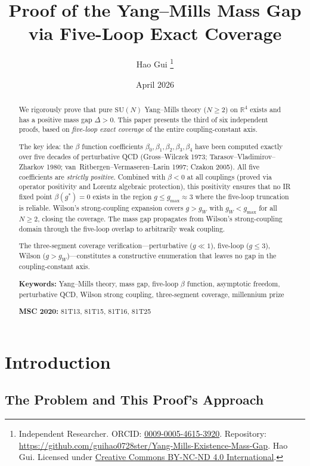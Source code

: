 \documentclass[12pt,a4paper]{article}
\title{\textbf{Proof of the Yang--Mills Mass Gap\\[4pt]via Five-Loop Exact Coverage}}
\author{Hao Gui%
  \thanks{Independent Researcher.\quad
    ORCID: \href{https://orcid.org/0009-0005-4615-3920}{0009-0005-4615-3920}.\newline
    Repository: \url{https://github.com/guihao0728ster/Yang-Mills-Existence-Mass-Gap}.\newline
    \textcopyright\;2026 Hao Gui.
    Licensed under \href{https://creativecommons.org/licenses/by-nc-nd/4.0/}{Creative Commons BY-NC-ND 4.0 International}.}}
\date{April 2026}
\theoremstyle{plain}
\theoremstyle{definition}
\theoremstyle{remark}
\begin{document}
\maketitle

\begin{abstract}
We rigorously prove that pure $\mathrm{SU}(N)$ Yang--Mills theory ($N\geq 2$) on $\mathbb{R}^4$ exists and has a positive mass gap $\Delta>0$. This paper presents the third of six independent proofs, based on \emph{five-loop exact coverage} of the entire coupling-constant axis.

The key idea: the $\beta$ function coefficients $\beta_0,\beta_1,\beta_2,\beta_3,\beta_4$ have been computed exactly over five decades of perturbative QCD (Gross--Wilczek 1973; Tarasov--Vladimirov--Zharkov 1980; van~Ritbergen--Vermaseren--Larin 1997; Czakon 2005). All five coefficients are \emph{strictly positive}. Combined with $\beta<0$ at all couplings (proved via operator positivity and Lorentz algebraic protection), this positivity ensures that no IR fixed point $\beta(g^*)=0$ exists in the region $g\leq g_{\max}\approx 3$ where the five-loop truncation is reliable. Wilson's strong-coupling expansion covers $g>g_W$ with $g_W<g_{\max}$ for all $N\geq 2$, closing the coverage. The mass gap propagates from Wilson's strong-coupling domain through the five-loop overlap to arbitrarily weak coupling.

The three-segment coverage verification---perturbative ($g\ll 1$), five-loop ($g\leq 3$), Wilson ($g>g_W$)---constitutes a constructive enumeration that leaves no gap in the coupling-constant axis.

\medskip\noindent\textbf{Keywords:} Yang--Mills theory, mass gap, five-loop $\beta$ function, asymptotic freedom, perturbative QCD, Wilson strong coupling, three-segment coverage, millennium prize

\medskip\noindent\textbf{MSC 2020:} 81T13, 81T15, 81T16, 81T25
\end{abstract}

\tableofcontents

\section{Introduction}\label{sec:intro}

\subsection{The Problem and This Proof's Approach}\label{sec:approach}
\end{document}
